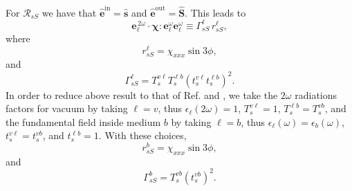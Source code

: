 \documentclass[10pt]{article}
\begin{document}
For $\mathcal{R}_{sS}$ we have that
$\hat{\mathbf{e}}^{\mathrm{in}}=\hat{\mathbf{s}}$ and
$\hat{\mathbf{e}}^{\mathrm{out}}=\hat{\mathbf{S}}$. This leads to
\begin{equation*}
\mathbf{e}^{\,2\omega}_{\ell}\cdot
\boldsymbol{\chi}:\mathbf{e}^\omega_{\ell}\mathbf{e}^\omega_{\ell}
\equiv\Gamma^{\ell}_{sS}\, r^{\ell}_{sS},
\end{equation*}
where
\begin{equation}
r^{\ell}_{sS} = \chi_{xxx}\sin3\phi,
\end{equation}
and
\begin{equation}
\Gamma^{\ell}_{sS}=
T^{v\ell}_{s}T^{\ell b}_{s}\left(t^{v\ell}_{s}t^{\ell b}_{s}\right)^{2}.
\end{equation} 
In order to reduce above result to that of Ref. \cite{mizrahiJOSA88} and
\cite{sipePRB87}, we take the $2\omega$ radiations factors for vacuum by
taking $\ell=v$, thus $\epsilon_{\ell}(2\omega)=1$, $T^{v\ell}_{s}=1$,
$T^{\ell b}_{s}=T^{vb}_{s}$, and the fundamental field inside medium $b$ by
taking $\ell=b$, thus $\epsilon_{\ell}(\omega)=\epsilon_{b}(\omega)$,
$t^{v\ell}_{s}=t^{vb}_{s}$, and $t^{\ell b}_{s}=1$. With these choices,
\begin{equation*}
r^{b}_{sS} = \chi_{xxx}\sin3\phi,
\end{equation*}
and 
\begin{equation*}
\Gamma^{b}_{sS} = T^{vb}_{s}\left(t^{vb}_{s}\right)^{2}.
\end{equation*} 


\appendix

%




\end{document}
